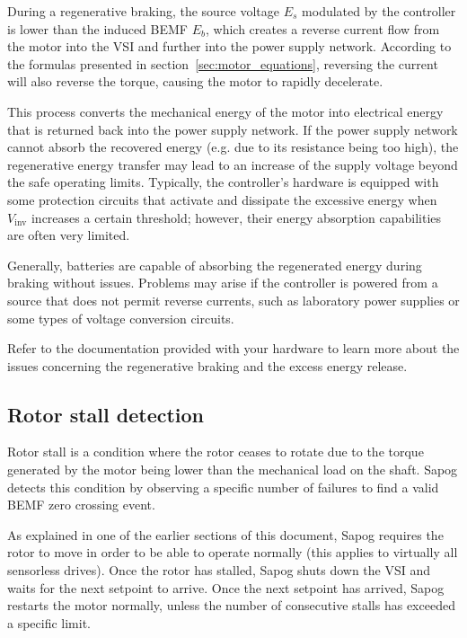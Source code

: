 \documentclass{zubaxdoc}
\begin{document}
	During a regenerative braking, the source voltage $E_s$ modulated by the controller is lower than the
	induced BEMF $E_b$, which creates a reverse current flow from the motor into the VSI
	and further into the power supply network.
	According to the formulas presented in section~\ref{sec:motor_equations},
	reversing the current will also reverse the torque, causing the motor to rapidly decelerate.
	
	This process converts the mechanical energy of the motor into electrical energy that is returned back into the
	power supply network.
	If the power supply network cannot absorb the recovered energy (e.g. due to its resistance being too high),
	the regenerative energy transfer may lead to an increase of the supply voltage beyond the safe operating limits.
	Typically, the controller's hardware is equipped with some protection circuits that activate and dissipate the
	excessive energy when $V_\text{inv}$ increases a certain threshold;
	however, their energy absorption capabilities are often very limited.
	
	Generally, batteries are capable of absorbing the regenerated energy during braking without issues.
	Problems may arise if the controller is powered from a source that does not permit reverse currents,
	such as laboratory power supplies or some types of voltage conversion circuits.
	
	Refer to the documentation provided with your hardware to learn more about the issues
	concerning the regenerative braking and the excess energy release.
	
	\subsection{Rotor stall detection}\label{sec:stall_detection}
	
	Rotor stall is a condition where the rotor ceases to rotate due to the torque generated by the motor
	being lower than the mechanical load on the shaft.
	Sapog detects this condition by observing a specific number of failures to find
	a valid BEMF zero crossing event.
	
	As explained in one of the earlier sections of this document,
	Sapog requires the rotor to move in order to be able to operate normally
	(this applies to virtually all sensorless drives).
	Once the rotor has stalled, Sapog shuts down the VSI and waits for the next setpoint to arrive.
	Once the next setpoint has arrived, Sapog restarts the motor normally,
	unless the number of consecutive stalls has exceeded a specific limit.
	
\end{document}
